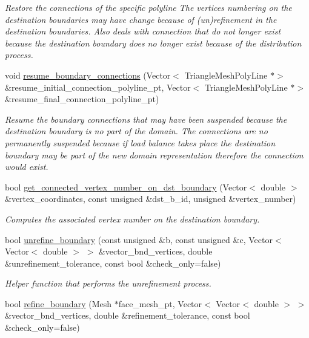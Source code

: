 \begin{DoxyCompactItemize}
\begin{DoxyCompactList}\small\item\em Restore the connections of the specific polyline The vertices numbering on the destination boundaries may have change because of (un)refinement in the destination boundaries. Also deals with connection that do not longer exist because the destination boundary does no longer exist because of the distribution process. \end{DoxyCompactList}\item 
void \hyperlink{classoomph_1_1RefineableTriangleMesh_a418d6f148c3c62a0e714831dd0d73acf}{resume\+\_\+boundary\+\_\+connections} (Vector$<$ Triangle\+Mesh\+Poly\+Line $\ast$$>$ \&resume\+\_\+initial\+\_\+connection\+\_\+polyline\+\_\+pt, Vector$<$ Triangle\+Mesh\+Poly\+Line $\ast$$>$ \&resume\+\_\+final\+\_\+connection\+\_\+polyline\+\_\+pt)
\begin{DoxyCompactList}\small\item\em Resume the boundary connections that may have been suspended because the destination boundary is no part of the domain. The connections are no permanently suspended because if load balance takes place the destination boundary may be part of the new domain representation therefore the connection would exist. \end{DoxyCompactList}\item 
bool \hyperlink{classoomph_1_1RefineableTriangleMesh_a097fbc660755f2127f575580d086c3aa}{get\+\_\+connected\+\_\+vertex\+\_\+number\+\_\+on\+\_\+dst\+\_\+boundary} (Vector$<$ double $>$ \&vertex\+\_\+coordinates, const unsigned \&dst\+\_\+b\+\_\+id, unsigned \&vertex\+\_\+number)
\begin{DoxyCompactList}\small\item\em Computes the associated vertex number on the destination boundary. \end{DoxyCompactList}\item 
bool \hyperlink{classoomph_1_1RefineableTriangleMesh_a504b89cdb0149dc7cbbf50bc270829fe}{unrefine\+\_\+boundary} (const unsigned \&b, const unsigned \&c, Vector$<$ Vector$<$ double $>$ $>$ \&vector\+\_\+bnd\+\_\+vertices, double \&unrefinement\+\_\+tolerance, const bool \&check\+\_\+only=false)
\begin{DoxyCompactList}\small\item\em Helper function that performs the unrefinement process. \end{DoxyCompactList}\item 
bool \hyperlink{classoomph_1_1RefineableTriangleMesh_a9bd4d46e9a61131b8b8f2b68579ac972}{refine\+\_\+boundary} (Mesh $\ast$face\+\_\+mesh\+\_\+pt, Vector$<$ Vector$<$ double $>$ $>$ \&vector\+\_\+bnd\+\_\+vertices, double \&refinement\+\_\+tolerance, const bool \&check\+\_\+only=false)

\end{DoxyCompactItemize}
